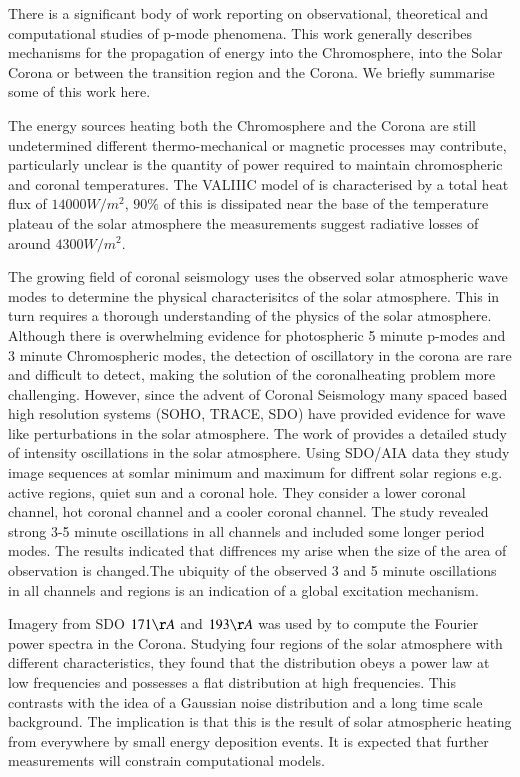 \documentclass{aa}
\begin{document}
There is a significant body of work reporting on observational, theoretical and computational studies of p-mode phenomena. This work generally describes mechanisms for the propagation of energy into the Chromosphere, into the Solar Corona or between the transition region and the Corona. We briefly summarise some of this work here. 

The energy sources heating both the Chromosphere and the Corona are still undetermined different thermo-mechanical or magnetic processes may contribute, particularly unclear is the quantity of power required to maintain chromospheric and coronal temperatures.  The VALIIIC model of  \cite{Vernazza1981} is characterised by a total heat flux of $14000W/m^2$, $90\%$ of this is dissipated near the base of the temperature plateau of the solar atmosphere the measurements suggest radiative losses of around $4300W/m^2$.

The growing field of coronal seismology uses the observed solar atmospheric wave modes to determine the physical characterisitcs of the solar atmosphere. This in turn requires a thorough understanding of the physics of the solar atmosphere. Although there is overwhelming evidence for photospheric 5 minute p-modes and 3 minute Chromospheric modes, the detection of oscillatory in the corona are rare and difficult to detect, making the solution of the coronalheating problem more challenging. However, since the advent of Coronal Seismology \cite{Roberts1984} \cite{DeMoortel2005} many spaced based high resolution systems (SOHO, TRACE, SDO) have provided evidence for wave like perturbations in the solar atmosphere.
The work of \cite{Erdelyi2015} provides a detailed study of intensity oscillations in the solar atmosphere. Using SDO/AIA data they study image sequences at somlar minimum and maximum for diffrent solar regions e.g. active regions, quiet sun and a coronal hole. They consider a lower coronal channel, hot coronal channel and a cooler coronal channel. The study revealed strong 3-5 minute oscillations in all channels and included some longer period modes. The results indicated that diffrences my arise when the size of the area of observation is changed.The ubiquity of the observed 3 and 5 minute oscillations in all channels and regions is an indication of a global excitation mechanism.

 Imagery from SDO $171\AA$ and $193\AA$ was used by \cite{Ireland2014} to compute the Fourier power spectra in the Corona. Studying four regions of the solar atmosphere with different characteristics, they found that the distribution obeys a power law at low frequencies and possesses a flat distribution at high frequencies. This contrasts with the idea of a Gaussian noise distribution and a long time scale background. The implication is that this is the result of solar atmospheric heating from everywhere by small energy deposition events. It is expected that further measurements will constrain computational models. 
\end{document}
